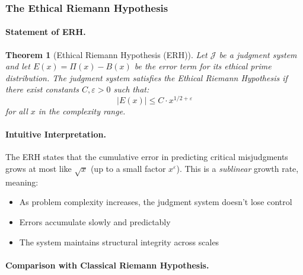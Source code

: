 \documentclass[12pt,a4paper]{article}
\newtheorem{theorem}{Theorem}[section]
\theoremstyle{definition}
\theoremstyle{remark}
\begin{document}
\subsubsection{The Ethical Riemann Hypothesis}
\label{sec:erh}

\paragraph{Statement of ERH.}

\begin{theorem}[Ethical Riemann Hypothesis (ERH)]
\label{thm:erh}
Let $\mathcal{J}$ be a judgment system and let $E(x) = \Pi(x) - B(x)$ be the error term for its ethical prime distribution. The judgment system satisfies the \emph{Ethical Riemann Hypothesis} if there exist constants $C, \varepsilon > 0$ such that:
\[
|E(x)| \leq C \cdot x^{1/2 + \varepsilon}
\]
for all $x$ in the complexity range.
\end{theorem}

\paragraph{Intuitive Interpretation.}
The ERH states that the cumulative error in predicting critical misjudgments grows at most like $\sqrt{x}$ (up to a small factor $x^\varepsilon$). This is a \emph{sublinear} growth rate, meaning:

\begin{itemize}
    \item As problem complexity increases, the judgment system doesn't lose control
    \item Errors accumulate slowly and predictably
    \item The system maintains structural integrity across scales
\end{itemize}

\paragraph{Comparison with Classical Riemann Hypothesis.}
\end{document}
